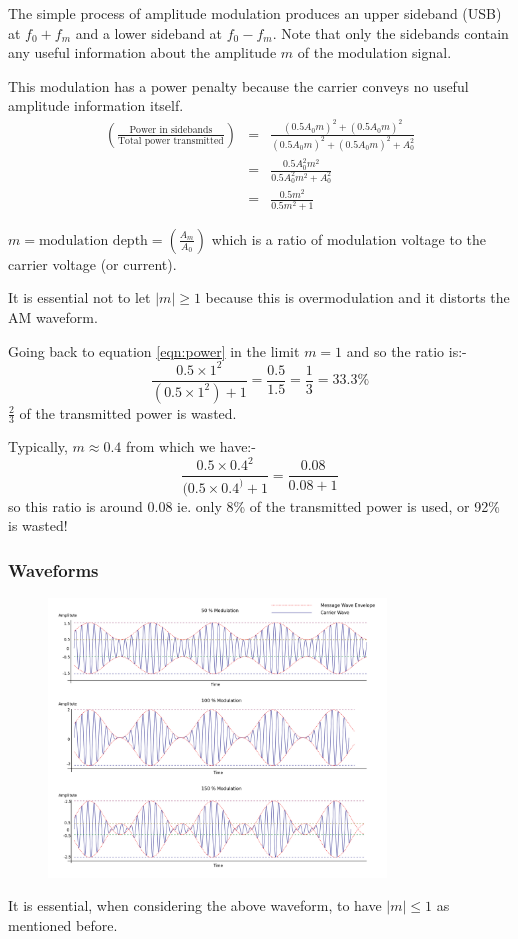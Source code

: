 \documentclass[11pt]{article} %
\begin{document}

The simple process of amplitude modulation produces an upper sideband (USB) at $f_0+f_m$ and a lower sideband at $f_0-f_m$. Note that only the sidebands contain any useful information about the amplitude $m$ of the modulation signal.

This modulation has a power penalty because the carrier conveys no useful amplitude information itself.
\begin{eqnarray}
\left(\frac{\mbox{Power in sidebands}}{\mbox{Total power transmitted}}\right) &=& \frac{(0.5A_0m)^2+(0.5A_0m)^2}{(0.5A_0m)^2+(0.5A_0m)^2+A_0^2} \nonumber \\
&=& \frac{0.5A_0^2m^2}{0.5A_0^2m^2 + A_0^2} \nonumber \\
&=& \frac{0.5m^2}{0.5m^2+1}
\label{eqn:power}
\end{eqnarray}

$m = \mbox{modulation depth} = \left(\frac{A_m}{A_0}\right)$ which is a ratio of modulation voltage to the carrier voltage (or current).

It is essential not to let $|m|\ge 1$ because this is overmodulation and it distorts the AM waveform.

Going back to equation \ref{eqn:power}  in the limit $m=1$ and so the ratio is:-
\begin{equation}
\frac{0.5\times 1^2}{(0.5\times 1^2)+1} = \frac{0.5}{1.5} = \frac{1}{3} = 33.3\%
\end{equation}
$\frac{2}{3}$ of the transmitted power is wasted.

Typically, $m\approx 0.4$ from which we have:-
\begin{equation}
\frac{0.5\times 0.4^2}{(0.5\times 0.4^)+1} = \frac{0.08}{0.08+1}
\end{equation}
so this ratio is around 0.08 ie. only 8\% of the transmitted power is used, or 92\% is wasted!

\subsubsection{Waveforms}
	\begin{figure}[h]
		\centering
		\includegraphics[width=0.8\textwidth]{modulatedwave}
	\end{figure}
It is essential, when considering the above waveform, to have $|m|\le 1$ as mentioned before.
\end{document}
